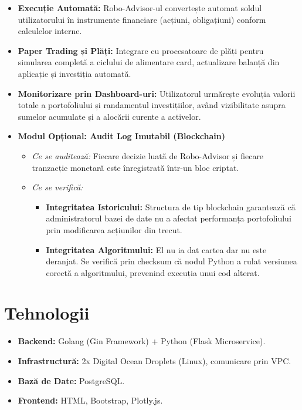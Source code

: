 \documentclass[12pt, a4paper]{article}
\begin{document}
\begin{itemize}
    \item \textbf{Execuție Automată:} Robo-Advisor-ul convertește automat soldul utilizatorului în instrumente financiare (acțiuni, obligațiuni) conform calculelor interne.
    
    \item \textbf{Paper Trading și Plăți:} Integrare cu procesatoare de plăți pentru simularea completă a ciclului de alimentare card, actualizare balanță din aplicație și investiția automată.
    
    \item \textbf{Monitorizare prin Dashboard-uri:} Utilizatorul urmărește evoluția valorii totale a portofoliului și randamentul investițiilor, având vizibilitate asupra sumelor acumulate și a alocării curente a activelor.
    
    \item \textbf{Modul Opțional: Audit Log Imutabil (Blockchain)}
    \begin{itemize}
        \item \textit{Ce se auditează:} Fiecare decizie luată de Robo-Advisor și fiecare tranzacție monetară este înregistrată într-un bloc criptat.
        \item \textit{Ce se verifică:}
        \begin{itemize}
            \item \textbf{Integritatea Istoricului:} Structura de tip blockchain garantează că administratorul bazei de date nu a afectat performanța portofoliului prin modificarea acțiunilor din trecut.
            \item \textbf{Integritatea Algoritmului:} El nu ia dat cartea dar nu este deranjat. Se verifică prin checksum că nodul Python a rulat versiunea corectă a algoritmului, prevenind execuția unui cod alterat.
        \end{itemize}
    \end{itemize}
\end{itemize}

\section{Tehnologii}

\begin{itemize}
    \item \textbf{Backend:} Golang (Gin Framework) + Python (Flask Microservice).
    \item \textbf{Infrastructură:} 2x Digital Ocean Droplets (Linux), comunicare prin VPC.
    \item \textbf{Bază de Date:} PostgreSQL.
    \item \textbf{Frontend:} HTML, Bootstrap, Plotly.js.
\end{itemize}
\end{document}
